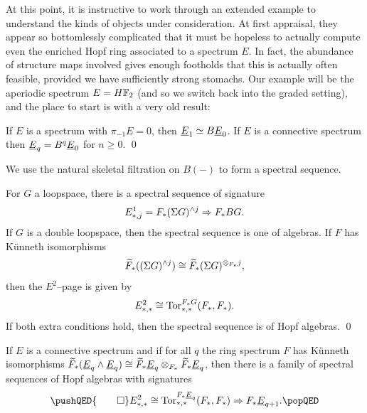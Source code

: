 At this point, it is instructive to work through an extended example to understand the kinds of objects under consideration.
At first appraisal, they appear so bottomlessly complicated that it must be hopeless to actually compute even the enriched Hopf ring associated to a spectrum \(E\).
In fact, the abundance of structure maps involved gives enough footholds that this is actually often feasible, provided we have sufficiently strong stomachs.
Our example will be the aperiodic spectrum \(E = \HFtwo\) (and so we switch back into the graded setting), and the place to start is with a very old result:
\begin{lemma}
If \(E\) is a spectrum with \(\pi_{-1} E = 0\), then \(\OS{E}{1} \simeq B\OS{E}{0}\).
If \(E\) is a connective spectrum then \(\OS{E}{q} = B^q \OS{E}{0}\) for \(n \ge 0\). \qed
\end{lemma}
\noindent We use the natural skeletal filtration on \(B(-)\) to form a spectral sequence.
\begin{lemma}
For \(G\) a loopspace, there is a spectral sequence of signature \[E^1_{*, j} = F_*(\Sigma G)^{\wedge j} \Rightarrow F_* BG.\]
If \(G\) is a double loopspace, then the spectral sequence is one of algebras.
If \(F\) has K\"unneth isomorphisms \[\widetilde F_*((\Sigma G)^{\wedge j}) \cong \widetilde F_*(\Sigma G)^{\otimes_{F_*} j},\] then the \(E^2\)--page is given by \[E^2_{*, *} \cong \operatorname{Tor}^{F_* G}_{*, *}(F_*, F_*).\]
If both extra conditions hold, then the spectral sequence is of Hopf algebras. \qed
\end{lemma}
\begin{corollary}
If \(E\) is a connective spectrum and if for all \(q\) the ring spectrum \(F\) has K\"unneth isomorphisms \(\widetilde F_*(\OS{E}{q} \sm \OS{E}{q}) \cong \widetilde F_* \OS{E}{q} \otimes_{F_*} \widetilde F_* \OS{E}{q}\), then there is a family of spectral sequences of Hopf algebras with signatures
\[
\pushQED{\qed}
E^2_{*, *} \cong \Tor^{F_* \OS{E}{q}}_{*, *}(F_*, F_*) \Rightarrow F_* \OS{E}{q+1}. \qedhere
\popQED
\]
\end{corollary}

